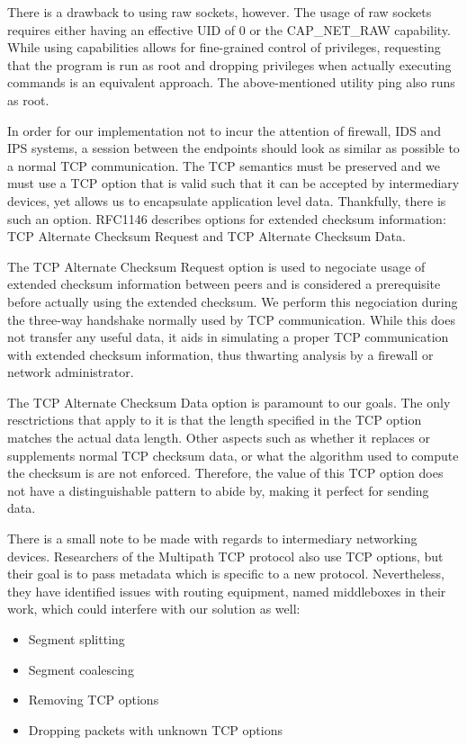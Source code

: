 There is a drawback to using raw sockets, however. The usage of raw sockets
requires either having an effective UID of 0 or the CAP_NET_RAW capability.
While using capabilities allows for fine-grained control of privileges, requesting
that the program is run as root and dropping privileges when actually executing
commands is an equivalent approach. The above-mentioned utility ping also
runs as root.

In order for our implementation not to incur the attention of firewall, IDS and
IPS systems, a session between the endpoints should look as similar as possible
to a normal TCP communication. The TCP semantics must be preserved and we must
use a TCP option that is valid such that it can be accepted by intermediary
devices, yet allows us to encapsulate application level data. Thankfully, there
is such an option. RFC1146 \cite{rfc1146} describes options for extended checksum
information: TCP Alternate Checksum Request and TCP Alternate Checksum Data.

The TCP Alternate Checksum Request option is used to negociate usage of extended
checksum information between peers and is considered a prerequisite before actually
using the extended checksum. We perform this negociation during the three-way
handshake normally used by TCP communication. While this does not transfer any
useful data, it aids in simulating a proper TCP communication with extended
checksum information, thus thwarting analysis by a firewall or network administrator.

The TCP Alternate Checksum Data option is paramount to our goals. The only
resctrictions that apply to it is that the length specified in the TCP option
matches the actual data length. Other aspects such as whether it replaces or
supplements normal TCP checksum data, or what the algorithm used to compute the
checksum is are not enforced. Therefore, the value of this TCP option does not
have a distinguishable pattern to abide by, making it perfect for sending data.

There is a small note to be made with regards to intermediary networking devices.
Researchers of the Multipath TCP protocol \cite{mptcp-how-hard} also use TCP options, but
their goal is to pass metadata which is specific to a new protocol. Nevertheless,
they have identified issues with routing equipment, named middleboxes in their work,
which could interfere with our solution as well:
\begin{itemize}
\item Segment splitting
\item Segment coalescing
\item Removing TCP options
\item Dropping packets with unknown TCP options
\end{itemize}


